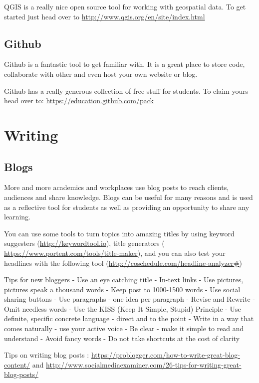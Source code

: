 \documentclass[]{book}
\theoremstyle{definition}
\theoremstyle{definition}
\theoremstyle{remark}
\begin{document}
QGIS is a really nice open source tool for working with geospatial data.
To get started just head over to
\url{http://www.qgis.org/en/site/index.html}

\subsection{Github}\label{github}

Github is a fantastic tool to get familiar with. It is a great place to
store code, collaborate with other and even host your own website or
blog.

Github has a really generous collection of free stuff for students. To
claim yours head over to: \url{https://education.github.com/pack}

\section{Writing}\label{writing}

\subsection{Blogs}\label{blogs}

More and more academics and workplaces use blog posts to reach clients,
audiences and share knowledge. Blogs can be useful for many reasons and
is used as a reflective tool for students as well as providing an
opportunity to share any learning.

You can use some tools to turn topics into amazing titles by using
keyword suggesters (\url{http://keywordtool.io}), title generators (
\url{https://www.portent.com/tools/title-maker}), and you can also test
your headlines with the following tool
(\url{http://coschedule.com/headline-analyzer\#})

Tips for new bloggers - Use an eye catching title - In-text links - Use
pictures, pictures speak a thousand words - Keep post to 1000-1500 words
- Use social sharing buttons - Use paragraphs - one idea per paragraph -
Revise and Rewrite - Omit needless words - Use the KISS (Keep It Simple,
Stupid) Principle - Use definite, specific concrete language - direct
and to the point - Write in a way that comes naturally - use your active
voice - Be clear - make it simple to read and understand - Avoid fancy
words - Do not take shortcuts at the cost of clarity

Tips on writing blog posts :
\url{https://problogger.com/how-to-write-great-blog-content/} and
\url{http://www.socialmediaexaminer.com/26-tips-for-writing-great-blog-posts/}
\end{document}
